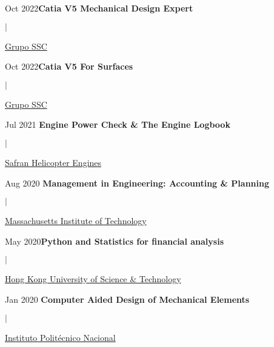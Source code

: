 \documentclass[a4paper,11pt]{article}
\begin{document}
\begin{minipage}[c]{11cm}Oct 2022\hfill\textbf{Catia V5 Mechanical Design Expert}\end{minipage}\;$|$\begin{minipage}[t]{10cm}\href{https://drive.google.com/file/d/1QpBqdWeVxuZTt_aJFGjAuV2xMgxxCZ52/view?usp=sharing}{Grupo SSC }\end{minipage}\hfill\break  
\begin{minipage}[c]{11cm}Oct 2022\hfill\textbf{Catia V5 For Surfaces}\end{minipage}\;$|$\begin{minipage}[t]{10cm}\href{https://drive.google.com/file/d/1QpBqdWeVxuZTt_aJFGjAuV2xMgxxCZ52/view?usp=sharing}{Grupo SSC} \end{minipage}\hfill\break
\begin{minipage}[c]{11cm}Jul 2021\hfill\textbf{ Engine Power Check \& The Engine Logbook}\end{minipage}\;$|$\begin{minipage}[t]{10cm}\href{https://drive.google.com/file/d/1uVe7zORQMWoyOtph2i59KAxAy_3aDU45/view?usp=sharing}{Safran Helicopter Engines}\end{minipage}\hfill\break
\begin{minipage}[c]{11cm}Aug 2020 \textbf{Management in Engineering: Accounting \& Planning}\end{minipage}\;$|$\begin{minipage}[t]{10cm}\href{https://courses.edx.org/certificates/c36631a49887413dbf7956dc3c14f132}{Massachusetts Institute of Technology}\end{minipage}\hfill\break
\begin{minipage}[c]{11cm}May 2020\hfil\textbf{Python and Statistics for financial analysis}\end{minipage}\;$|$\begin{minipage}[t]{11cm}\href{https://coursera.org/share/1843e6460cdb8a17e4c669d41a5c4088}{Hong Kong University of Science \& Technology}\end{minipage}\hfil\break
\begin{minipage}[c]{11cm}Jan 2020 \textbf{Computer Aided Design of Mechanical Elements}\end{minipage}\;$|$\begin{minipage}[t]{10cm}\href{}{Instituto Politécnico Nacional} \hfill\break \end{minipage}
\end{document}
